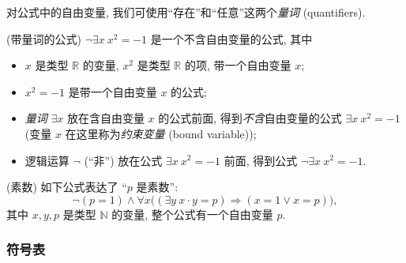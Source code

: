 对公式中的自由变量, 我们可使用``存在''和``任意''这两个\emph{量词} (quantifiers).

\begin{example}
	{(带量词的公式)}
	$\neg\exists x\ x^2=-1$ 是一个不含自由变量的公式, 其中
	\begin{itemize}
		\item $x$ 是类型 $\mathbb{R}$ 的变量, $x^2$ 是类型 $\mathbb{R}$ 的项, 带一个自由变量 $x$;
		\item $x^2=-1$ 是带一个自由变量 $x$ 的公式;
		\item \emph{量词} $\exists x$ 放在含自由变量 $x$ 的公式前面, 得到\emph{不含}自由变量的公式 $\exists x\ x^2=-1$ (变量 $x$ 在这里称为\emph{约束变量} (bound variable));
		\item 逻辑运算 $\neg$ (``非'') 放在公式 $\exists x\ x^2=-1$ 前面, 得到公式 $\neg\exists x\ x^2=-1$. %
	\end{itemize}
\end{example}

\begin{example}
	{(素数)}
	如下公式表达了 ``$p$ 是素数'':
	$$
	\neg(p=1) \wedge \forall x \big((\exists y\ x\cdot y = p) \Rightarrow (x=1 \vee x=p)\big),
	$$
	其中 $x,y,p$ 是类型 $\mathbb{N}$ 的变量,
	整个公式有一个自由变量 $p$.
\end{example}





\subsubsection{符号表}

